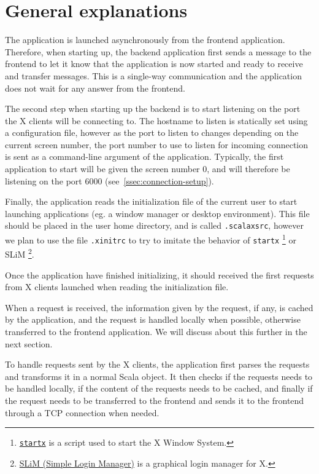 \section{General explanations}
%
The application is launched asynchronously from the frontend application. 
Therefore, when starting up, the backend application first sends a message to 
the frontend to let it know that the application is now started and ready to 
receive and transfer messages. This is a single-way communication and the 
application does not wait for any answer from the frontend.

The second step when starting up the backend is to start listening on the 
port the X clients will be connecting to. The hostname 
to listen is statically set using a configuration file, however as the port 
to listen to changes depending on the current screen number, the port number to 
use to listen for incoming connection is sent as a command-line argument of the 
application. Typically, the first application to start will be given the 
screen number $0$, and will therefore be listening on the port $6000$ 
(see~\ref{ssec:connection-setup}).

Finally, the application reads the initialization file of the current user 
to start launching applications (eg. a window manager or desktop environment). 
This file should be placed in the user home directory, and is called 
\lstinline{.scalaxsrc}, however we plan to use the file \lstinline{.xinitrc} to 
try to imitate the behavior of \lstinline{startx}
\footnote{\href{http://linux.die.net/man/1/startx}{\lstinline{startx}} is a script used to start the X Window System.}
or SLiM
\footnote{\href{http://slim.berlios.de/}{SLiM (Simple Login Manager)} is a graphical login manager for X.}.

Once the application have finished initializing, it should received the first requests 
from X clients launched when reading the initialization file.

When a request is received, the information given by the request, if any, is cached 
by the application, and the request is handled locally when possible, otherwise 
transferred to the frontend application. We will discuss about this further in the next 
section.

To handle requests sent by the X clients, the application first parses the requests and 
transforms it in a normal Scala object. It then checks if the requests needs to be handled 
locally, if the content of the requests needs to be cached, and finally if the request 
needs to be transferred to the frontend and sends it to the frontend through a TCP connection 
when needed.
